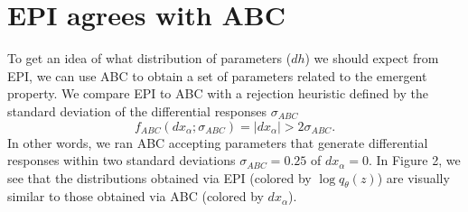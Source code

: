 \documentclass[11pt]{article}
\begin{document}
\section{EPI agrees with ABC}
To get an idea of what distribution of parameters ($dh$) we should expect from EPI, we can use ABC to obtain a set of parameters related to the emergent property.  
We compare EPI to ABC with a rejection heuristic defined by the standard deviation of the differential responses $\sigma_{ABC}$
 \[f_{ABC}(dx_\alpha; \sigma_{ABC}) = |dx_\alpha| > 2\sigma_{ABC}.\]
 In other words, we ran ABC accepting parameters that generate differential responses within two standard deviations $\sigma_{ABC}=0.25$ of $dx_\alpha = 0$.
 In Figure 2, we see that the distributions obtained via EPI (colored by $\log q_\theta(z)$) are visually similar to those obtained via ABC (colored by $dx_\alpha$). \\
 
\end{document}
